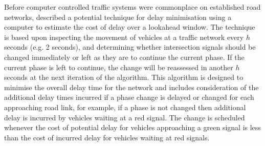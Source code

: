 Before computer controlled traffic systems were commonplace on established road networks,  described a potential technique for delay minimisation using a computer to estimate the cost of delay over a lookahead window. The technique is based upon inspecting the movement of vehicles at a traffic network every $h$ seconds (e.g. 2 seconds), and determining whether intersection signals should be changed immediately or left as they are to continue the current phase. If the current phase is left to continue, the change will be reassessed in another $h$ seconds at the next iteration of the algorithm. This algorithm is designed to minimise the overall delay time for the network and includes consideration of the additional delay times incurred if a phase change is delayed or changed for each approaching road link, for example, if a phase is not changed then additional delay is incurred by vehicles waiting at a red signal. The change is scheduled whenever the cost of potential delay for vehicles approaching a green signal is less than the cost of incurred delay for vehicles waiting at red signals. 








